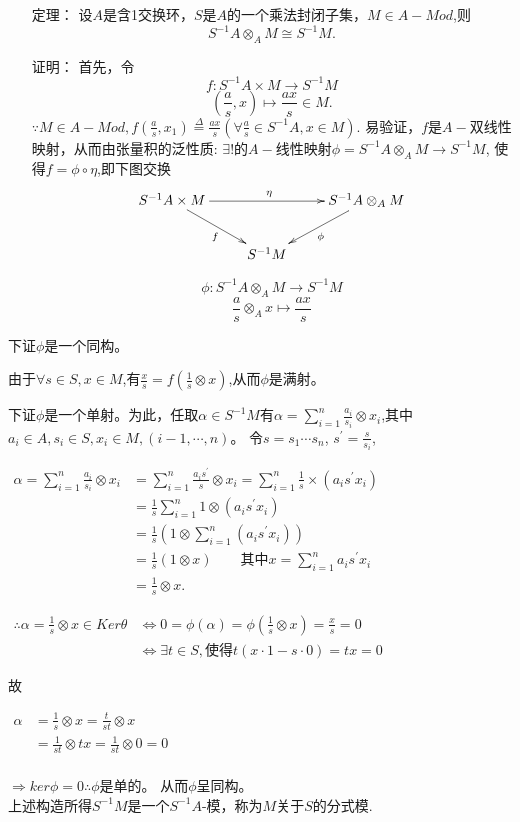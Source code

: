 \documentclass[UTF8]{article}
\begin{document}
\begin{itemize}
	\item[定理：] 设$A$是含1交换环，$S$是$A$的一个乘法封闭子集，$M\in A-Mod$,则
	$$
	S^{-1}A\otimes_{A}M\cong S^{-1}M.
	$$
	\item[证明：] 首先，令$$
	f:S^{-1}A\times M\rightarrow S^{-1}M$$
	$$
	\left(\frac{a}{s},x\right)\mapsto \frac{ax}{s}\in M. 
	$$
	$\because M\in A-Mod,f(\frac{a}{s},x_1)\stackrel{\Delta}{=}\frac{ax}{s}(\forall\frac{a}{s}\in S^{-1}A, x\in M).$
	易验证，$f$是$A-$双线性映射，从而由张量积的泛性质:
	$\exists!$的$A-$线性映射$\phi=S^{-1}A\otimes_AM\rightarrow S^{-1}M$,
	使得$f=\phi\circ\eta$,即下图交换
	$$
	\xymatrix{
		S^{-1}A\times M\ar[rr]^{\eta}\ar[rd]_{f}& &S^{-1}A\otimes_{A}M\ar[ld]^{\phi}\\
		&S^{-1}M&
	}
	$$
	
	$$
	\phi:S^{-1}A\otimes_AM\rightarrow S^{-1}M$$
	$$
	\frac{a}{s}\otimes_{A}x\mapsto\frac{ax}{s}
	$$	
\end{itemize}
\noindent 下证$\phi$是一个同构。


由于$\forall s\in S, x\in M$,有$\frac{x}{s}=f(\frac{1}{s}\otimes x)$,从而$\phi$是满射。


下证$\phi$是一个单射。为此，任取$\alpha\in S^{-1}M$有$\alpha=\sum_{i=1}^{n}\frac{a_i}{s_i}\otimes x_i$,其中$a_i\in A, s_i\in S, x_i\in M, (i-1,\cdots,n)$。
令$s=s_1\cdots s_n$, $s^\prime=\frac{s}{s_i}$,
\begin{center}
	$\begin{aligned}
	\alpha=\sum_{i=1}^{n}\frac{a_i}{s_i}\otimes x_i&=\sum_{i=1}^{n}\frac{a_is^\prime}{s}\otimes x_i=\sum_{i=1}^{n}\frac{1}{s}\times (a_is^\prime x_i)\\
	&=\frac{1}{s}\sum_{i=1}^{n}1\otimes(a_is^\prime x_i)\\
	&=\frac{1}{s}\left(1\otimes\sum_{i=1}^{n}(a_is^\prime x_i)\right)\\
	&=\frac{1}{s}(1\otimes x)\qquad\text{其中}x=\sum_{i=1}^{n}a_is^\prime x_i\\
	&=\frac{1}{s}\otimes x.
	\end{aligned}$
\end{center}

\begin{center}
	$\begin{aligned}
	\therefore\alpha=\frac{1}{s}\otimes x\in Ker\theta&\Leftrightarrow0=\phi(\alpha)=\phi(\frac{1}{s}\otimes x)=\frac{x}{s}=0\\
	&\Leftrightarrow \exists t\in S, \text{使得}t(x\cdot1-s\cdot0)=tx=0
	\end{aligned}$
\end{center}
故
\begin{center}
	$\begin{aligned}
	\alpha&=\frac{1}{s}\otimes x=\frac{t}{st}\otimes x\\
	&=\frac{1}{st}\otimes tx=\frac{1}{st}\otimes0=0\\
	\end{aligned}$
\end{center}
$\Rightarrow ker\phi=0$$\therefore \phi$是单的。
从而$\phi$呈同构。\\
上述构造所得$S^{-1}M$是一个$S^{-1}A$-模，称为$M$关于$S$的分式模.\\
\end{document}
